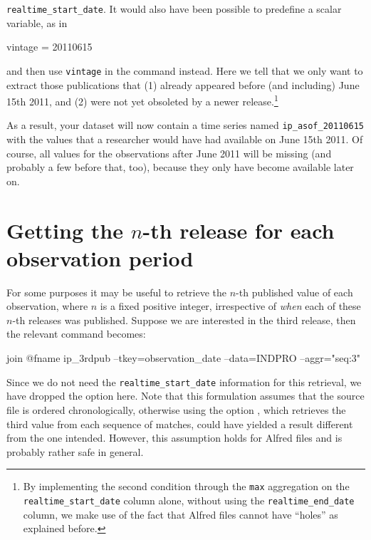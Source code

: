 \begin{itemize}
  \verb|realtime_start_date|. It would also have been possible to 
  predefine a scalar variable, as in
 \begin{code}
   vintage = 20110615
 \end{code}
  and then use \texttt{vintage} in the  command instead.
  Here we tell  that we only want to extract those
  publications that (1) already appeared before (and including) June
  15th 2011, and (2) were not yet obsoleted by a newer
  release.\footnote{By implementing the second condition through the
    \texttt{max} aggregation on the \verb|realtime_start_date| column
    alone, without using the \verb|realtime_end_date| column, we make
    use of the fact that Alfred files cannot have ``holes'' as
    explained before.}
\end{itemize}

As a result, your dataset will now contain a time series named
\verb|ip_asof_20110615| with the values that a researcher would have
had available on June 15th 2011. Of course, all values for the
observations after June 2011 will be missing (and probably a few
before that, too), because they only have become available later on.

\section{Getting the $n$-th release for each observation period}
\label{sec:realtime-nth}

For some purposes it may be useful to retrieve the $n$-th published
value of each observation, where $n$ is a fixed positive integer,
irrespective of \emph{when} each of these $n$-th releases was
published. Suppose we are interested in the third release, then the
relevant  command becomes:
\begin{code}
  join @fname ip_3rdpub --tkey=observation_date --data=INDPRO --aggr="seq:3"
\end{code}
Since we do not need the \verb|realtime_start_date| information for this 
retrieval, we have
dropped the  option here. Note that this formulation
assumes that the source file is ordered chronologically, otherwise
using the option , which retrieves the third
value from each sequence of matches, could have yielded a result
different from the one intended. However, this assumption holds for
Alfred files and is probably rather safe in general.

